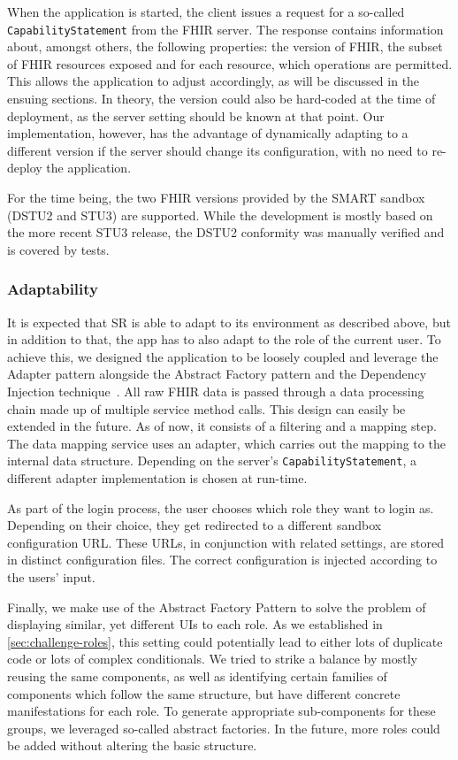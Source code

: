 \documentclass[sigconf]{acmart}
\begin{document}
When the application is started, the client issues a request for a so-called \texttt{CapabilityStatement} from the FHIR server. The response contains information about, amongst others, the following properties:
the version of FHIR,
the subset of FHIR resources exposed and
for each resource, which operations are permitted.
%
This allows the application to adjust accordingly, as will be discussed in the ensuing sections. In theory, the version could also be hard-coded at the time of deployment, as the server setting should be known at that point. Our implementation, however, has the advantage of dynamically adapting to a different version if the server should change its configuration, with no need to re-deploy the application.

For the time being, the two FHIR versions provided by the SMART sandbox (DSTU2 and STU3) are supported. While the development is mostly based on the more recent STU3 release, the DSTU2 conformity was manually verified and is covered by tests.%


\subsubsection{Adaptability}

It is expected that SR is able to adapt to its environment as described above, but in addition to that, the app has to also adapt to the role of the current user. To achieve this, we designed the application to be loosely coupled and leverage the Adapter pattern alongside the Abstract Factory pattern and the Dependency Injection technique~\cite{design-patterns}.
%
All raw FHIR data is passed through a data processing chain made up of multiple service method calls. This design can easily be extended in the future. As of now, it consists of a filtering and a mapping step. The data mapping service uses an adapter, which carries out the mapping to the internal data structure. Depending on the server's \texttt{CapabilityStatement}, a different adapter implementation is chosen at run-time. 

As part of the login process, the user chooses which role they want to login as. Depending on their choice, they get redirected to a different sandbox configuration URL. These URLs, in conjunction with related settings, are stored in distinct configuration files. The correct configuration is injected according to the users' input.

Finally, we make use of the Abstract Factory Pattern to solve the problem of displaying similar, yet different UIs to each role. As we established in \ref{sec:challenge-roles}, this setting could potentially lead to either lots of duplicate code or lots of complex conditionals. We tried to strike a balance by mostly reusing the same components, as well as identifying certain families of components which follow the same structure, but have different concrete manifestations for each role. To generate appropriate sub-components for these groups, we leveraged so-called abstract factories. In the future, more roles could be added without altering the basic structure.
\end{document}
